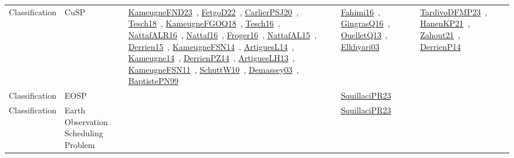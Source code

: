 {\begin{longtable}{lp{3cm}>{\raggedright\arraybackslash}p{6cm}>{\raggedright\arraybackslash}p{6cm}>{\raggedright\arraybackslash}p{8cm}}
Classification & CuSP & \href{../works/KameugneFND23.pdf}{KameugneFND23}~\cite{KameugneFND23}, \href{../works/FetgoD22.pdf}{FetgoD22}~\cite{FetgoD22}, \href{../works/CarlierPSJ20.pdf}{CarlierPSJ20}~\cite{CarlierPSJ20}, \href{../works/Tesch18.pdf}{Tesch18}~\cite{Tesch18}, \href{../works/KameugneFGOQ18.pdf}{KameugneFGOQ18}~\cite{KameugneFGOQ18}, \href{../works/Tesch16.pdf}{Tesch16}~\cite{Tesch16}, \href{../works/NattafALR16.pdf}{NattafALR16}~\cite{NattafALR16}, \href{../works/Nattaf16.pdf}{Nattaf16}~\cite{Nattaf16}, \href{../works/Froger16.pdf}{Froger16}~\cite{Froger16}, \href{../works/NattafAL15.pdf}{NattafAL15}~\cite{NattafAL15}, \href{../works/Derrien15.pdf}{Derrien15}~\cite{Derrien15}, \href{../works/KameugneFSN14.pdf}{KameugneFSN14}~\cite{KameugneFSN14}, \href{../works/ArtiguesL14.pdf}{ArtiguesL14}~\cite{ArtiguesL14}, \href{../works/Kameugne14.pdf}{Kameugne14}~\cite{Kameugne14}, \href{../works/DerrienPZ14.pdf}{DerrienPZ14}~\cite{DerrienPZ14}, \href{../works/ArtiguesLH13.pdf}{ArtiguesLH13}~\cite{ArtiguesLH13}, \href{../works/KameugneFSN11.pdf}{KameugneFSN11}~\cite{KameugneFSN11}, \href{../works/SchuttW10.pdf}{SchuttW10}~\cite{SchuttW10}, \href{../works/Demassey03.pdf}{Demassey03}~\cite{Demassey03}, \href{../works/BaptistePN99.pdf}{BaptistePN99}~\cite{BaptistePN99} & \href{../works/Fahimi16.pdf}{Fahimi16}~\cite{Fahimi16}, \href{../works/GingrasQ16.pdf}{GingrasQ16}~\cite{GingrasQ16}, \href{../works/OuelletQ13.pdf}{OuelletQ13}~\cite{OuelletQ13}, \href{../works/Elkhyari03.pdf}{Elkhyari03}~\cite{Elkhyari03} & \href{../works/TardivoDFMP23.pdf}{TardivoDFMP23}~\cite{TardivoDFMP23}, \href{../works/HanenKP21.pdf}{HanenKP21}~\cite{HanenKP21}, \href{../works/Zahout21.pdf}{Zahout21}~\cite{Zahout21}, \href{../works/DerrienP14.pdf}{DerrienP14}~\cite{DerrienP14}\\
Classification & EOSP &  & \href{../works/SquillaciPR23.pdf}{SquillaciPR23}~\cite{SquillaciPR23} & \\
Classification & Earth Observation Scheduling Problem &  & \href{../works/SquillaciPR23.pdf}{SquillaciPR23}~\cite{SquillaciPR23} & \\

\end{longtable}}
